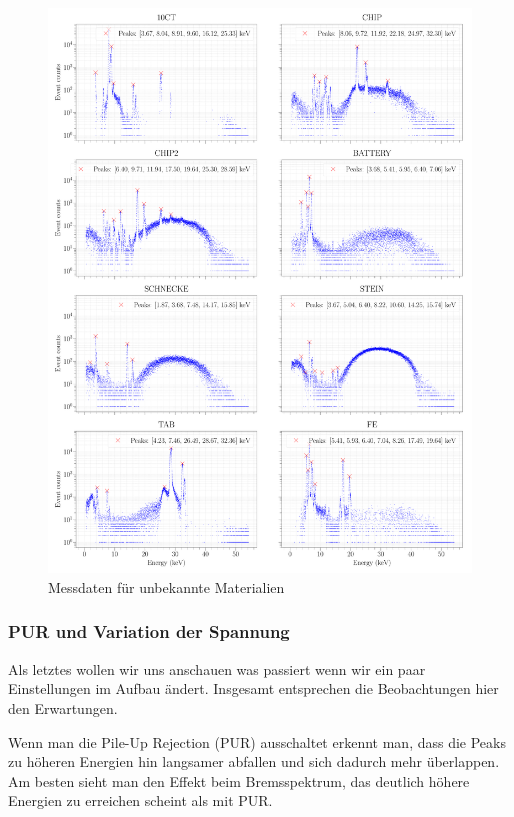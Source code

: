 \documentclass[a4paper,14pt]{article}
\begin{document}
\begin{figure}[H]
\centering
\includegraphics[scale=0.2]{../Figures/XRay-analysis.pdf}
\caption{Messdaten für unbekannte Materialien}
\label{XRay_analysis}
\end{figure}

\subsubsection{PUR und Variation der Spannung}
Als letztes wollen wir uns anschauen was passiert wenn wir ein paar Einstellungen im Aufbau ändert. Insgesamt entsprechen die Beobachtungen hier den Erwartungen.

Wenn man die Pile-Up Rejection (PUR) ausschaltet erkennt man, dass die Peaks zu höheren Energien hin langsamer abfallen und sich dadurch mehr überlappen. Am besten sieht man den Effekt beim Bremsspektrum, das deutlich höhere Energien zu erreichen scheint als mit PUR.
\end{document}
